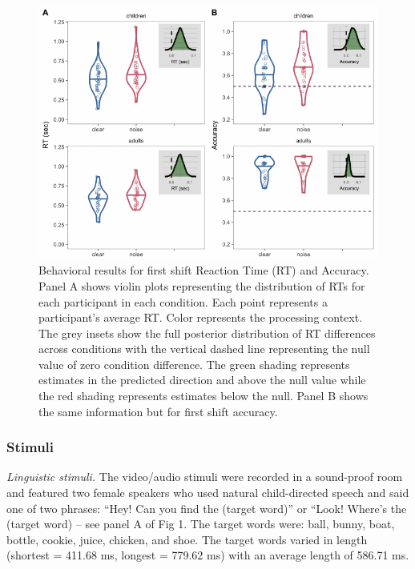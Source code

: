 \documentclass[10pt, letterpaper]{article}
\newenvironment{CodeChunk}{}{}
\begin{document}
\begin{CodeChunk}
\begin{figure}[t]

{\centering \includegraphics[width=0.85\linewidth]{figs/noise_acc_rt_e1_plot-1} 

}

\caption[Behavioral results for first shift Reaction Time (RT) and Accuracy]{Behavioral results for first shift Reaction Time (RT) and Accuracy. Panel A shows violin plots representing the distribution of RTs for each participant in each condition. Each point represents a participant's average RT. Color represents the processing context. The grey insets show the full posterior distribution of RT differences across conditions with the vertical dashed line representing the null value of zero condition difference. The green shading represents estimates in the predicted direction and above the null value while the red shading represents estimates below the null. Panel B shows the same information but for first shift accuracy.}\label{fig:noise_acc_rt_e1_plot}
\end{figure}
\end{CodeChunk}

\subsubsection{Stimuli}\label{stimuli}

\emph{Linguistic stimuli.} The video/audio stimuli were recorded in a
sound-proof room and featured two female speakers who used natural
child-directed speech and said one of two phrases: ``Hey! Can you find
the (target word)'' or ``Look! Where's the (target word) -- see panel A
of Fig 1. The target words were: ball, bunny, boat, bottle, cookie,
juice, chicken, and shoe. The target words varied in length (shortest =
411.68 ms, longest = 779.62 ms) with an average length of 586.71 ms.
\end{document}
